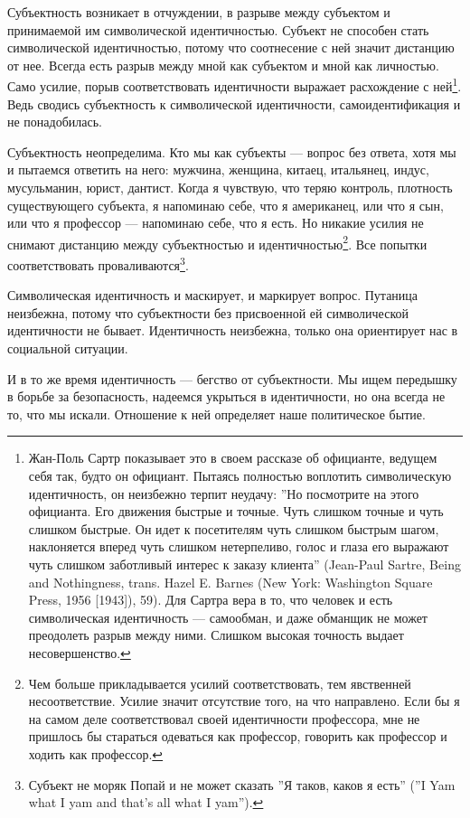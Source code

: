 \documentclass[12pt]{book}
\begin{document}
Субъектность возникает в отчуждении, в разрыве между субъектом и принимаемой им символической идентичностью. Субъект не способен стать символической идентичностью, потому что соотнесение с ней значит дистанцию от нее. Всегда есть разрыв между мной как субъектом и мной как личностью. Само усилие, порыв соответствовать идентичности выражает расхождение с ней\footnote{Жан-Поль Сартр показывает это в своем рассказе об официанте, ведущем себя так, будто он официант. Пытаясь полностью воплотить символическую идентичность, он неизбежно терпит неудачу: ''Но посмотрите на этого официанта. Его движения быстрые и точные. Чуть слишком точные и чуть слишком быстрые. Он идет к посетителям чуть слишком быстрым шагом, наклоняется вперед чуть слишком нетерпеливо, голос и глаза его выражают чуть слишком заботливый интерес к заказу клиента'' (Jean-Paul Sartre, Being and Nothingness, trans. Hazel E. Barnes (New York: Washington Square Press, 1956 [1943]), 59). Для Сартра вера в то, что человек и есть символическая идентичность --- самообман, и даже обманщик не может преодолеть разрыв между ними. Слишком высокая точность выдает несовершенство.}. Ведь сводись субъектность к символической идентичности, самоидентификация и не понадобилась.

Субъектность неопределима. Кто мы как субъекты --- вопрос без ответа, хотя мы и пытаемся ответить на него: мужчина, женщина, китаец, итальянец, индус, мусульманин, юрист, дантист. Когда я чувствую, что теряю контроль, плотность существующего субъекта, я напоминаю себе, что я американец, или что я сын, или что я профессор --- напоминаю себе, что я есть. Но никакие усилия не снимают дистанцию между субъектностью и идентичностью\footnote{Чем больше прикладывается усилий соответствовать, тем явственней несоответствие. Усилие значит отсутствие того, на что направлено. Если бы я на самом деле соответствовал своей идентичности профессора, мне не пришлось бы стараться одеваться как профессор, говорить как профессор и ходить как профессор.}. Все попытки соответствовать проваливаются\footnote{Субъект не моряк Попай и не может сказать ''Я таков, каков я есть'' (''I Yam what I yam and that's all what I yam'').}.

Символическая идентичность и маскирует, и маркирует вопрос. Путаница неизбежна, потому что субъектности без присвоенной ей символической идентичности не бывает. Идентичность неизбежна, только она ориентирует нас в социальной ситуации.

И в то же время идентичность --- бегство от субъектности. Мы ищем передышку в борьбе за безопасность, надеемся укрыться в идентичности, но она всегда не то, что мы искали. Отношение к ней определяет наше политическое бытие.
\end{document}
